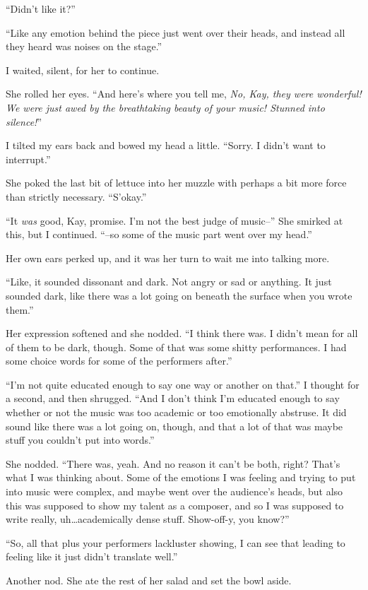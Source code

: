 ``Didn't like it?''

``Like any emotion behind the piece just went over their heads, and instead all they heard was noises on the stage.''

I waited, silent, for her to continue.

She rolled her eyes. ``And here's where you tell me, \emph{No, Kay, they were wonderful! We were just awed by the breathtaking beauty of your music! Stunned into silence!}''

I tilted my ears back and bowed my head a little. ``Sorry. I didn't want to interrupt.''

She poked the last bit of lettuce into her muzzle with perhaps a bit more force than strictly necessary. ``S'okay.''

``It \emph{was} good, Kay, promise. I'm not the best judge of music--'' She smirked at this, but I continued. ``--so some of the music part went over my head.''

Her own ears perked up, and it was her turn to wait me into talking more.

``Like, it sounded dissonant and dark. Not angry or sad or anything. It just sounded dark, like there was a lot going on beneath the surface when you wrote them.''

Her expression softened and she nodded. ``I think there was. I didn't mean for all of them to be dark, though. Some of that was some shitty performances. I had some choice words for some of the performers after.''

``I'm not quite educated enough to say one way or another on that.'' I thought for a second, and then shrugged. ``And I don't think I'm educated enough to say whether or not the music was too academic or too emotionally abstruse. It did sound like there was a lot going on, though, and that a lot of that was maybe stuff you couldn't put into words.''

She nodded. ``There was, yeah. And no reason it can't be both, right? That's what I was thinking about. Some of the emotions I was feeling and trying to put into music were complex, and maybe went over the audience's heads, but also this was supposed to show my talent as a composer, and so I was supposed to write really, uh\ldots academically dense stuff. Show-off-y, you know?''

``So, all that plus your performers lackluster showing, I can see that leading to feeling like it just didn't translate well.''

Another nod. She ate the rest of her salad and set the bowl aside.

